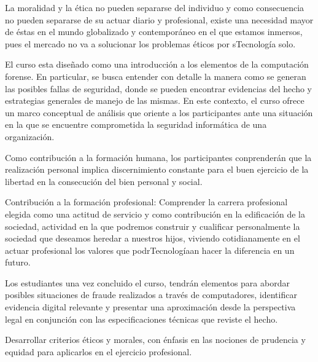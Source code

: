\begin{syllabus}


\begin{justification}
La moralidad y la ética no pueden separarse del individuo y como consecuencia
no pueden separarse de su actuar diario y profesional, existe una necesidad 
mayor de éstas en el mundo globalizado y contemporáneo en el que estamos inmersos, 
pues el mercado no va a solucionar los problemas éticos por sTecnología solo.

El curso esta diseñado como una introducción a los elementos de la computación forense. 
En particular, se busca entender con detalle la manera como se generan las posibles 
fallas de seguridad, donde se pueden encontrar evidencias del hecho y estrategias 
generales de manejo de las mismas. En este contexto, el curso ofrece un marco 
conceptual de análisis que oriente a los participantes ante una situación en la 
que se encuentre comprometida la seguridad informática de una organización.

Como contribución a la formación humana, los participantes conprenderán que la 
realización personal implica discernimiento constante para el buen ejercicio 
de la libertad en la consecución del bien personal y social.

Contribución a la formación profesional: Comprender la carrera profesional 
elegida como una actitud de servicio y como contribución en la edificación 
de la sociedad, actividad en la que podremos construir y cualificar personalmente 
la sociedad que deseamos heredar a nuestros hijos, viviendo cotidianamente 
en el actuar profesional los valores que podrTecnologíaan hacer la diferencia en un futuro.

Los estudiantes una vez concluido el curso, tendrán elementos para abordar 
posibles situaciones de fraude realizados a través de computadores, 
identificar evidencia digital relevante y presentar una aproximación desde la 
perspectiva legal en conjunción con las especificaciones técnicas que reviste 
el hecho.
\end{justification}

\begin{goals}
\item Desarrollar criterios éticos y morales, con énfasis en las nociones de prudencia y equidad para aplicarlos en el ejercicio profesional.
\end{goals}

\begin{outcomes}
\end{outcomes}


\end{syllabus}
